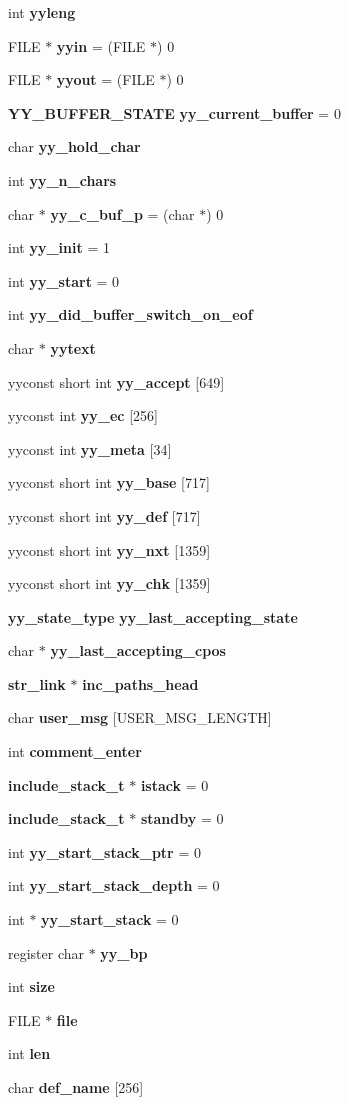\begin{CompactItemize}
\item 
int {\bf yyleng}
\item 
FILE $\ast$ {\bf yyin} = (FILE $\ast$) 0
\item 
FILE $\ast$ {\bf yyout} = (FILE $\ast$) 0
\item 
{\bf YY\_\-BUFFER\_\-STATE} {\bf yy\_\-current\_\-buffer} = 0
\item 
char {\bf yy\_\-hold\_\-char}
\item 
int {\bf yy\_\-n\_\-chars}
\item 
char $\ast$ {\bf yy\_\-c\_\-buf\_\-p} = (char $\ast$) 0
\item 
int {\bf yy\_\-init} = 1
\item 
int {\bf yy\_\-start} = 0
\item 
int {\bf yy\_\-did\_\-buffer\_\-switch\_\-on\_\-eof}
\item 
char $\ast$ {\bf yytext}
\item 
yyconst short int {\bf yy\_\-accept} [649]
\item 
yyconst int {\bf yy\_\-ec} [256]
\item 
yyconst int {\bf yy\_\-meta} [34]
\item 
yyconst short int {\bf yy\_\-base} [717]
\item 
yyconst short int {\bf yy\_\-def} [717]
\item 
yyconst short int {\bf yy\_\-nxt} [1359]
\item 
yyconst short int {\bf yy\_\-chk} [1359]
\item 
{\bf yy\_\-state\_\-type} {\bf yy\_\-last\_\-accepting\_\-state}
\item 
char $\ast$ {\bf yy\_\-last\_\-accepting\_\-cpos}
\item 
{\bf str\_\-link} $\ast$ {\bf inc\_\-paths\_\-head}
\item 
char {\bf user\_\-msg} [USER\_\-MSG\_\-LENGTH]
\item 
int {\bf comment\_\-enter}
\item 
{\bf include\_\-stack\_\-t} $\ast$ {\bf istack} = 0
\item 
{\bf include\_\-stack\_\-t} $\ast$ {\bf standby} = 0
\item 
int {\bf yy\_\-start\_\-stack\_\-ptr} = 0
\item 
int {\bf yy\_\-start\_\-stack\_\-depth} = 0
\item 
int $\ast$ {\bf yy\_\-start\_\-stack} = 0
\item 
register char $\ast$ {\bf yy\_\-bp}
\item 
int {\bf size}
\item 
FILE $\ast$ {\bf file}
\item 
int {\bf len}
\item 
char {\bf def\_\-name} [256]
\end{CompactItemize}



